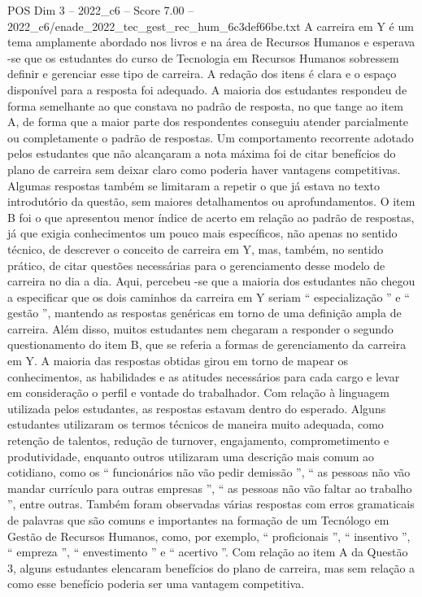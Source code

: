 \begin{textsample}{POS Dim 3 – 2022\_c6 – Score 7.00 – 2022\_c6/enade\_2022\_tec\_gest\_rec\_hum\_6c3def66be.txt}
A carreira em Y é um tema amplamente abordado nos livros e na área de Recursos Humanos e esperava -se que os estudantes do curso de Tecnologia em Recursos Humanos sobressem definir e gerenciar esse tipo de carreira.
A redação dos itens é clara e o espaço disponível para a resposta foi adequado.
A maioria dos estudantes respondeu de forma semelhante ao que constava no padrão de resposta, no que tange ao item A, de forma que a maior parte dos respondentes conseguiu atender parcialmente ou completamente o padrão de respostas.
Um comportamento recorrente adotado pelos estudantes que não alcançaram a nota máxima foi de citar benefícios do plano de carreira sem deixar claro como poderia haver vantagens competitivas.
Algumas respostas também se limitaram a repetir o que já estava no texto introdutório da questão, sem maiores detalhamentos ou aprofundamentos.
O item B foi o que apresentou menor índice de acerto em relação ao padrão de respostas, já que exigia conhecimentos um pouco mais específicos, não apenas no sentido técnico, de descrever o conceito de carreira em Y, mas, também, no sentido prático, de citar questões necessárias para o gerenciamento desse modelo de carreira no dia a dia.
Aqui, percebeu -se que a maioria dos estudantes não chegou a especificar que os dois caminhos da carreira em Y seriam “ especialização ” e “ gestão ”, mantendo as respostas genéricas em torno de uma definição ampla de carreira.
Além disso, muitos estudantes nem chegaram a responder o segundo questionamento do item B, que se referia a formas de gerenciamento da carreira em Y.
A maioria das respostas obtidas girou em torno de mapear os conhecimentos, as habilidades e as atitudes necessários para cada cargo e levar em consideração o perfil e vontade do trabalhador.
Com relação à linguagem utilizada pelos estudantes, as respostas estavam dentro do esperado.
Alguns estudantes utilizaram os termos técnicos de maneira muito adequada, como retenção de talentos, redução de turnover, engajamento, comprometimento e produtividade, enquanto outros utilizaram uma descrição mais comum ao cotidiano, como os “ funcionários não vão pedir demissão ”, “ as pessoas não vão mandar currículo para outras empresas ”, “ as pessoas não vão faltar ao trabalho ”, entre outras.
Também foram observadas várias respostas com erros gramaticais de palavras que são comuns e importantes na formação de um Tecnólogo em Gestão de Recursos Humanos, como, por exemplo, “ proficionais ”, “ insentivo ”, “ empreza ”, “ envestimento ” e “ acertivo ”.
Com relação ao item A da Questão 3, alguns estudantes elencaram benefícios do plano de carreira, mas sem relação a como esse benefício poderia ser uma vantagem competitiva.

\end{textsample}
